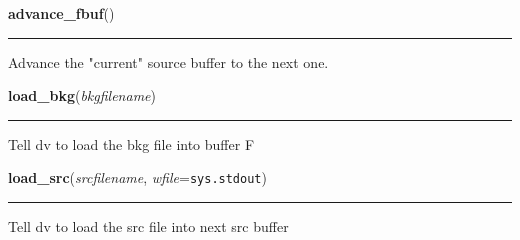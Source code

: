     \label{dv:advance_fbuf}

    \vspace{0.5ex}

    \begin{boxedminipage}{\textwidth}

    \raggedright \textbf{advance\_fbuf}()

    \vspace{-1.5ex}

    \rule{\textwidth}{0.5\fboxrule}
    Advance the "current" source buffer to the next one.

    \vspace{1ex}

    \end{boxedminipage}

    \label{dv:load_bkg}

    \vspace{0.5ex}

    \begin{boxedminipage}{\textwidth}

    \raggedright \textbf{load\_bkg}(\textit{bkgfilename})

    \vspace{-1.5ex}

    \rule{\textwidth}{0.5\fboxrule}
    Tell dv to load the bkg file into buffer F

    \vspace{1ex}

    \end{boxedminipage}

    \label{dv:load_src}

    \vspace{0.5ex}

    \begin{boxedminipage}{\textwidth}

    \raggedright \textbf{load\_src}(\textit{srcfilename}, \textit{wfile}=\texttt{sys.stdout})

    \vspace{-1.5ex}

    \rule{\textwidth}{0.5\fboxrule}
    Tell dv to load the src file into next src buffer

    \vspace{1ex}

    \end{boxedminipage}

